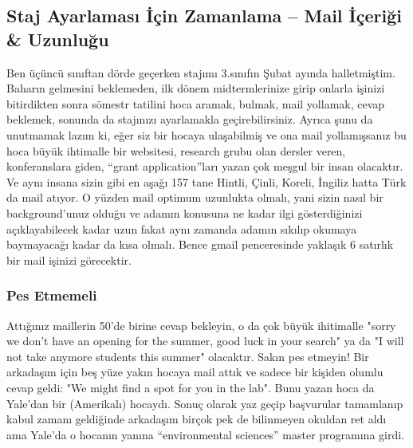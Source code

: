 \documentclass[12pt]{article}
\begin{document}
\subsection{Staj Ayarlaması İçin Zamanlama – Mail İçeriği \& Uzunluğu}
Ben üçüncü sınıftan dörde geçerken stajımı 3.sınıfın Şubat ayında halletmiştim. Baharın gelmesini beklemeden, ilk dönem midtermlerinize girip onlarla işinizi bitirdikten sonra sömestr tatilini hoca aramak, bulmak, mail yollamak, cevap beklemek, sonunda da stajınızı ayarlamakla geçirebilirsiniz. Ayrıca şunu da unutmamak lazım ki, eğer siz bir hocaya ulaşabilmiş ve ona mail yollamışsanız bu hoca büyük ihtimalle bir websitesi, research grubu olan dersler veren, konferanslara giden, “grant application”ları yazan çok meşgul bir insan olacaktır. Ve aynı insana sizin gibi en aşağı 157 tane Hintli, Çinli, Koreli, İngiliz hatta Türk da mail atıyor. O yüzden mail optimum uzunlukta olmalı, yani sizin nasıl bir background’unuz olduğu ve adamın konusuna ne kadar ilgi gösterdiğinizi açıklayabilecek kadar uzun fakat aynı zamanda adamın sıkılıp okumaya baymayacağı kadar da kısa olmalı. Bence gmail penceresinde yaklaşık 6 satırlık bir mail işinizi görecektir.

\subsubsection{Pes Etmemeli}
Attığınız maillerin 50'de birine cevap bekleyin, o da çok büyük ihitimalle "sorry we don't have an opening for the summer, good luck in your search" ya da "I will not take anymore students  this summer" olacaktır. Sakın pes etmeyin! Bir arkadaşım için beş yüze yakın hocaya mail attık ve sadece bir kişiden olumlu cevap geldi: "We might find a spot for you in the lab". Bunu yazan hoca da Yale'dan bir (Amerikalı) hocaydı. Sonuç olarak yaz geçip başvurular tamamlanıp kabul zamanı geldiğinde arkadaşım birçok pek de bilinmeyen okuldan ret aldı ama Yale'da o hocanın yanına “environmental sciences” master programına girdi.
\end{document}
